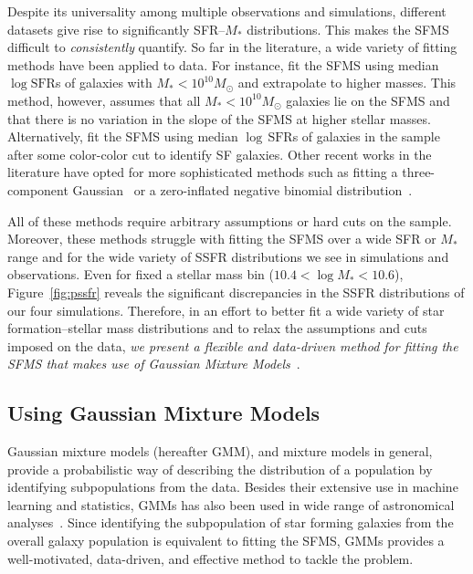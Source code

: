 \documentclass[preprint2,tighten]{aastex62}
\begin{document}
Despite its universality among multiple observations and simulations, 
different datasets give rise to significantly SFR--$M_*$ distributions.
This makes the SFMS difficult to \emph{consistently} quantify. So far 
in the literature, a wide variety 
of fitting methods have been applied to data. For instance, \cite{bluck2016} 
fit the SFMS using median $\log\mathrm{SFR}$s of galaxies with 
$M_* < 10^{10}M_\odot$ and extrapolate to higher masses. This method, however, 
assumes that all $M_* < 10^{10}M_\odot$ galaxies lie on the SFMS and that 
there is no variation in the slope of the SFMS at higher stellar masses. 
Alternatively, \cite{lee2015} fit the SFMS using median 
$\log\,\mathrm{SFR}$s of galaxies in the sample after some color-color cut 
to identify SF galaxies. Other recent works in the literature have opted 
for more sophisticated methods such as fitting a three-component
Gaussian~\citep{bisigello2018} or a zero-inflated negative binomial 
distribution~\citep{feldmann2017}. 

All of these methods require arbitrary assumptions or hard cuts on the 
sample. Moreover, these methods struggle with fitting the SFMS over a 
wide SFR or $M_*$ range and for the wide variety of SSFR distributions we see 
in simulations and observations. Even for fixed a stellar mass bin 
($10.4 < \log M_* < 10.6$), Figure~\ref{fig:pssfr} reveals the 
significant discrepancies in the SSFR distributions of our four simulations. 
Therefore, in an effort to better fit a wide variety of star formation--stellar
mass distributions and to relax the assumptions and cuts imposed on the data, 
\emph{we present a flexible and data-driven method for fitting the SFMS that 
makes use of Gaussian Mixture 
Models}~\citep[][]{Press:1992:NRC:148286, 9780471006268}. 

\subsection{Using Gaussian Mixture Models}
Gaussian mixture models (hereafter GMM), and mixture models in general, provide 
a probabilistic way of describing the distribution of a population by 
identifying subpopulations from the data. Besides their extensive use 
in machine learning and statistics, GMMs has also been used in wide range 
of astronomical analyses~\citep{bovy2011,lee2012,taylor2015}. 
Since identifying the subpopulation of star forming galaxies from the overall
galaxy population is equivalent to fitting the SFMS, GMMs provides a 
well-motivated, data-driven, and effective method to tackle the problem. 
\end{document}
